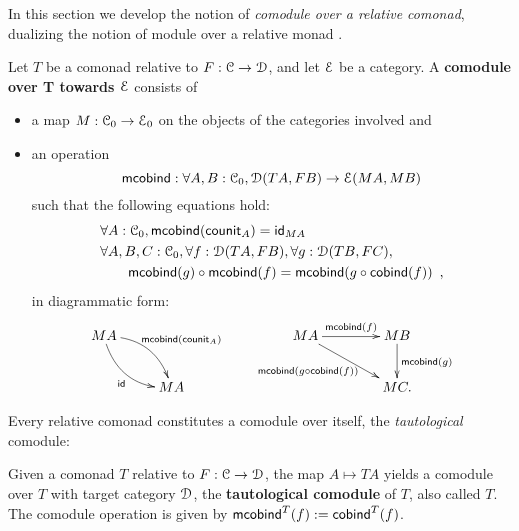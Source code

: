 \documentclass[a4paper,USenglish]{lipics}
\newcommand{\fat}[1]{\textbf{#1}}
\newcommand{\itemizedist}{.5em}
\begin{document}
In this section we develop the notion of \emph{comodule over a relative comonad}, dualizing the notion of module over a relative monad \parencite{ahrens_relmonads}.

\begin{defn}%
\label{def:comodule}
 Let $T$ be a comonad relative to $F:\C\to\D$, and let $\E$ be a category.
 A \fat{comodule over T towards $\E$} consists of
   \begin{itemize}\setlength{\itemsep}{\itemizedist}
   \item a map $M:\C_0 \to \E_0$ on the objects of the categories involved and
   \item an operation \[\mcobind: \forall A,B:\C_0, \D(TA,FB) \to \E(MA,MB)\] such that the following equations hold:
 \begin{align}
 &  \forall A : \C_0, \mcobind(\counit_A) = \id_{MA} \\
 & \forall A,B,C:\C_0, \forall f : \D(TA,FB),\forall g:\D(TB,FC), \notag\\
 &   \qquad      \comp{\mcobind(f)}{\mcobind(g)} = \mcobind(\comp{\cobind(f)}{g}) \enspace ,
 \end{align}
  in diagrammatic form:
\[
    \begin{xy}
    \xymatrix{
                       MA \ar@/^1pc/[rd]^{\mcobind(\counit_A)} \ar@/_1pc/[rd]_{\id}& \\
                          & MA
    }
   \end{xy}
   \qquad
   \begin{xy}
    \xymatrix@C=4em{
       MA \ar[r]^{\mcobind(f)} \ar[rd]_{\mcobind(\comp{\cobind(f)}{g})\;\;\;\;\;}& MB \ar[d]^{\mcobind(g)} \\
          & MC .
    }
   \end{xy}
\]  
  
  
  \end{itemize}

\end{defn}




Every relative comonad constitutes a comodule over itself, the \emph{tautological} comodule:

\begin{defn}
\label{def:tautological_comodule}
  Given a comonad $T$ relative to $F:\C\to\D$, the map $A \mapsto TA$ yields a comodule over $T$ 
  with target category $\D$, the \textbf{tautological comodule} of $T$, also called $T$.
  The comodule operation is given by
    $  \mcobind^T(f) := \cobind^T(f)$. 
\end{defn}
\end{document}
